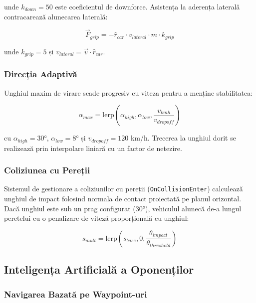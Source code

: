 \documentclass[11pt,twocolumn]{article}
\begin{document}
unde $k_{down} = 50$ este coeficientul de downforce. Asistența la aderența laterală contracarează alunecarea laterală:

\begin{equation}
    \vec{F}_{grip} = -\hat{r}_{car} \cdot v_{lateral} \cdot m \cdot k_{grip}
\end{equation}

unde $k_{grip} = 5$ și $v_{lateral} = \vec{v} \cdot \hat{r}_{car}$.

\subsubsection{Direcția Adaptivă}

Unghiul maxim de virare scade progresiv cu viteza pentru a menține stabilitatea:

\begin{equation}
    \alpha_{max} = \text{lerp}\left(\alpha_{high}, \alpha_{low}, \frac{v_{kmh}}{v_{dropoff}}\right)
\end{equation}

cu $\alpha_{high} = 30°$, $\alpha_{low} = 8°$ și $v_{dropoff} = 120$ km/h. Trecerea la unghiul dorit se realizează prin interpolare liniară cu un factor de netezire.

\subsubsection{Coliziunea cu Pereții}

Sistemul de gestionare a coliziunilor cu pereții (\texttt{OnCollisionEnter}) calculează unghiul de impact folosind normala de contact proiectată pe planul orizontal. Dacă unghiul este sub un prag configurat ($30°$), vehiculul alunecă de-a lungul peretelui cu o penalizare de viteză proporțională cu unghiul:

\begin{equation}
    s_{mult} = \text{lerp}\left(s_{base}, 0, \frac{\theta_{impact}}{\theta_{threshold}}\right)
\end{equation}

\subsection{Inteligența Artificială a Oponenților}

\subsubsection{Navigarea Bazată pe Waypoint-uri}
\end{document}
